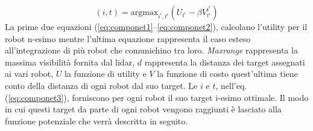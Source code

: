\begin{equation}	
\label{eq:componet3}
(i,t) = \text{argmax}_{i^{\iota},t^{\iota}} (U_{t^{\iota}}  -\beta V^{i^{\iota}}_{t^{\iota}} ) 
\end{equation}
%
La prime due equazioni (\ref{eq:componet1}--\ref{eq:componet2}), calcolano 
l'utility per il robot n-esimo mentre l'ultima equazione rappresenta il caso 
esteso all'integrazione di più robot che comunichino tra loro. 
\emph{Maxrange} rappresenta la massima visibilità fornita dal lidar, $d$ 
rappresenta la distanza dei target assegnati ai vari robot, $U$ la funzione di 
utility e $V$ la funzione di costo quest'ultima tiene conto della distanza di ogni 
robot dal suo target. Le $i$ e $t$, nell'eq.(\ref{eq:componet3}),  forniscono 
per ogni robot il suo target i-esimo ottimale.
Il modo in cui questi target da parte di ogni robot vengono raggiunti è 
lasciato alla funzione potenziale che verrà descritta in seguito.